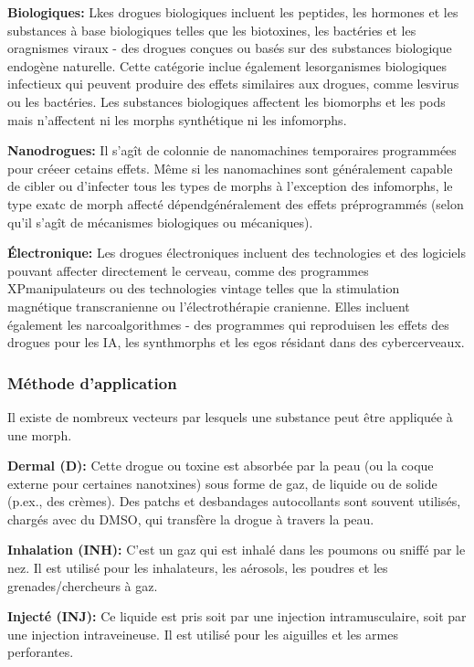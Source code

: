 \textbf{Biologiques:} Lkes drogues biologiques incluent les peptides, les hormones et les substances à base biologiques telles que les biotoxines, les bactéries et les oragnismes viraux - des drogues conçues ou basés sur des substances biologique endogène naturelle. Cette catégorie inclue également lesorganismes biologiques infectieux qui peuvent produire des effets similaires aux drogues, comme lesvirus ou les bactéries. Les substances biologiques affectent les biomorphs et les pods mais n'affectent ni les morphs synthétique ni les infomorphs. 

\textbf{Nanodrogues:} Il s'agît de colonnie de nanomachines temporaires programmées pour créeer cetains effets. Même si les nanomachines sont généralement capable de cibler ou d'infecter tous les types de morphs à l'exception des infomorphs, le type exatc de morph affecté dépendgénéralement des effets préprogrammés (selon qu'il s'agît de mécanismes biologiques ou mécaniques). 

\textbf{Électronique:} Les drogues électroniques incluent des technologies et des logiciels pouvant affecter directement le cerveau, comme des programmes XPmanipulateurs ou des technologies vintage telles que la stimulation magnétique transcranienne ou l'électrothérapie cranienne. Elles incluent également les narcoalgorithmes - des programmes qui reproduisen les effets des drogues pour les IA, les synthmorphs et les egos résidant dans des cybercerveaux. 

\subsubsection{Méthode d'application} 

Il existe de nombreux vecteurs par lesquels une substance peut être appliquée à une morph. 

\textbf{Dermal (D):} Cette drogue ou toxine est absorbée par la peau (ou la coque externe pour certaines nanotxines) sous forme de gaz, de liquide ou de solide (p.ex., des crèmes). Des patchs et desbandages autocollants sont souvent utilisés, chargés avec du DMSO, qui transfère la drogue à travers la peau. 

\textbf{Inhalation (INH):} C'est un gaz qui est inhalé dans les poumons ou sniffé par le nez. Il est utilisé pour les inhalateurs, les aérosols, les poudres et les grenades/chercheurs à gaz. 

\textbf{Injecté (INJ):} Ce liquide est pris soit par une injection intramusculaire, soit par une injection intraveineuse. Il est utilisé pour les aiguilles et les armes perforantes. 

